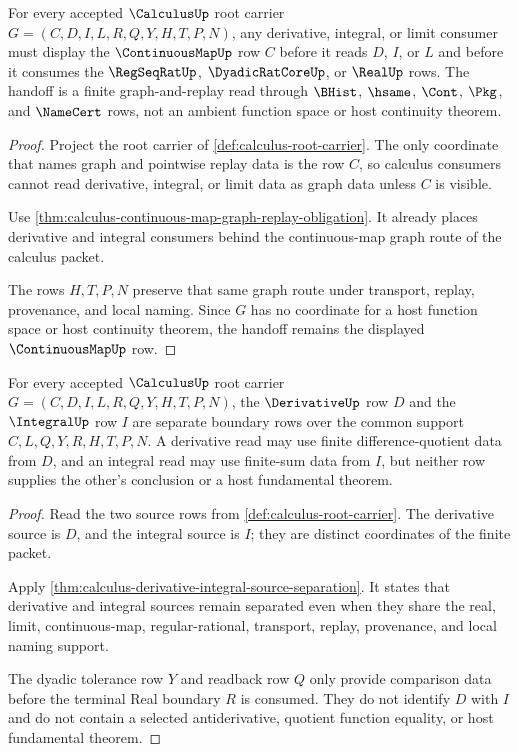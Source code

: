 \begin{theorem}
\label{thm:calculus-root-continuousmap-handoff}
For every accepted $\CalculusUp$ root carrier $G=(C,D,I,L,R,Q,Y,H,T,P,N)$, any derivative, integral, or limit consumer must display the $\ContinuousMapUp$ row $C$ before it reads $D$, $I$, or $L$ and before it consumes the $\RegSeqRatUp$, $\DyadicRatCoreUp$, or $\RealUp$ rows. The handoff is a finite graph-and-replay read through $\BHist$, $\hsame$, $\Cont$, $\Pkg$, and $\NameCert$ rows, not an ambient function space or host continuity theorem.
\end{theorem}
\begin{proof}
Project the root carrier of \autoref{def:calculus-root-carrier}. The only coordinate that names graph and pointwise replay data is the row $C$, so calculus consumers cannot read derivative, integral, or limit data as graph data unless $C$ is visible.

Use \autoref{thm:calculus-continuous-map-graph-replay-obligation}. It already places derivative and integral consumers behind the continuous-map graph route of the calculus packet.

The rows $H,T,P,N$ preserve that same graph route under transport, replay, provenance, and local naming. Since $G$ has no coordinate for a host function space or host continuity theorem, the handoff remains the displayed $\ContinuousMapUp$ row.
\end{proof}

\begin{theorem}
\label{thm:calculus-root-derivative-integral-boundary}
For every accepted $\CalculusUp$ root carrier $G=(C,D,I,L,R,Q,Y,H,T,P,N)$, the $\DerivativeUp$ row $D$ and the $\IntegralUp$ row $I$ are separate boundary rows over the common support $C,L,Q,Y,R,H,T,P,N$. A derivative read may use finite difference-quotient data from $D$, and an integral read may use finite-sum data from $I$, but neither row supplies the other's conclusion or a host fundamental theorem.
\end{theorem}
\begin{proof}
Read the two source rows from \autoref{def:calculus-root-carrier}. The derivative source is $D$, and the integral source is $I$; they are distinct coordinates of the finite packet.

Apply \autoref{thm:calculus-derivative-integral-source-separation}. It states that derivative and integral sources remain separated even when they share the real, limit, continuous-map, regular-rational, transport, replay, provenance, and local naming support.

The dyadic tolerance row $Y$ and readback row $Q$ only provide comparison data before the terminal Real boundary $R$ is consumed. They do not identify $D$ with $I$ and do not contain a selected antiderivative, quotient function equality, or host fundamental theorem.
\end{proof}

